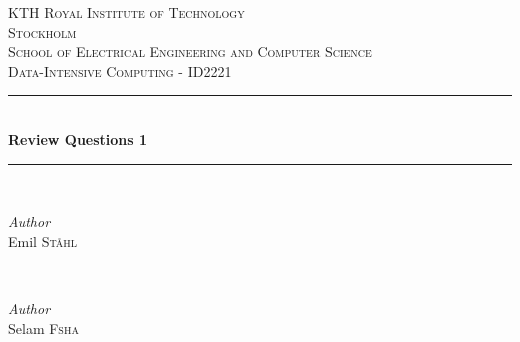 
\begin{titlepage} %
	\newcommand{\HRule}{\rule{\linewidth}{0.5mm}} %
	
	\center %
	
	
	\textsc{\LARGE KTH Royal Institute of Technology \\ Stockholm}\\[1.5cm] %
	
	\textsc{\Large School of Electrical Engineering and Computer Science}\\[0.5cm] %
	
	\textsc{\large Data-Intensive Computing - ID2221}\\[0.5cm] %
	
	
	\HRule\\[0.4cm]
	
	{\huge\bfseries Review Questions 1}\\[0.2cm] %
	
	\HRule\\[1.5cm]
	
	
		\begin{minipage}{0.4\textwidth}
		\begin{flushleft}
			\large
			\textit{Author}\\
			Emil \textsc{Ståhl}  %
		\end{flushleft}
	\end{minipage}
	~
	\begin{minipage}{0.4\textwidth}
		\begin{flushright}
			\large
			\textit{Author}\\
		    Selam \textsc{Fsha} %
		\end{flushright}
	\end{minipage}


\end{titlepage}
